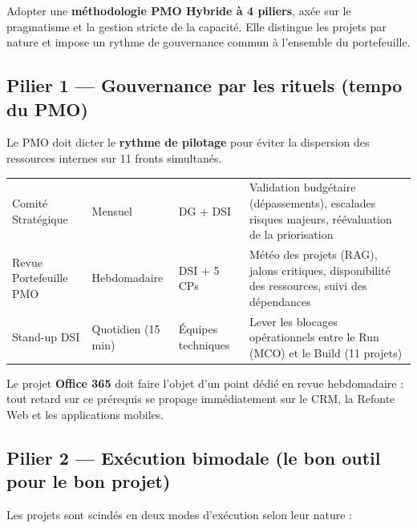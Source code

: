 \documentclass[11pt,a4paper,oneside]{report}
\begin{document}
\begin{decision}
Adopter une \textbf{méthodologie PMO Hybride à 4 piliers}, axée sur le pragmatisme et la gestion stricte de la capacité. Elle distingue les projets par nature et impose un rythme de gouvernance commun à l'ensemble du portefeuille.
\end{decision}

\subsection{Pilier 1 — Gouvernance par les rituels (tempo du PMO)}

Le PMO doit dicter le \textbf{rythme de pilotage} pour éviter la dispersion des ressources internes sur 11 fronts simultanés.

\vspace{4pt}
\begin{center}
\renewcommand{\arraystretch}{1.5}
\begin{tabularx}{\textwidth}{C{3cm} C{2.5cm} L{4cm} L{5cm}}
\toprule
{}
 &  &  &  \\
\midrule
Comité Stratégique & Mensuel & DG + DSI & Validation budgétaire (dépassements), escalades risques majeurs, réévaluation de la priorisation \\
Revue Portefeuille PMO & Hebdomadaire & DSI + 5 CPs & Météo des projets (RAG), jalons critiques, disponibilité des ressources, suivi des dépendances \\
Stand-up DSI & Quotidien (15\,min) & Équipes techniques & Lever les blocages opérationnels entre le Run (MCO) et le Build (11 projets) \\
\bottomrule
\end{tabularx}
\end{center}

\begin{alert}
Le projet \textbf{Office 365} doit faire l'objet d'un point dédié en revue hebdomadaire : tout retard sur ce prérequis se propage immédiatement sur le CRM, la Refonte Web et les applications mobiles.
\end{alert}

\subsection{Pilier 2 — Exécution bimodale (le bon outil pour le bon projet)}

Les projets sont scindés en deux modes d'exécution selon leur nature :
\end{document}
